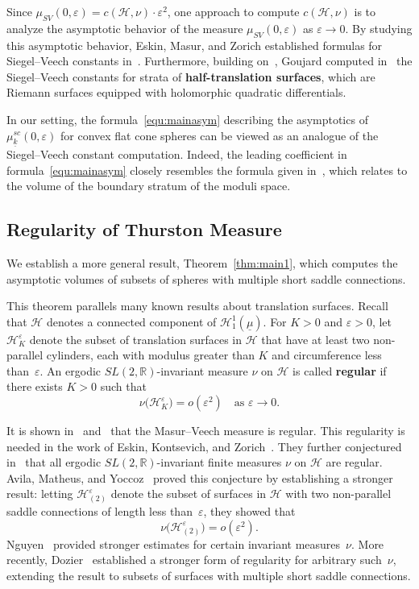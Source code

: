 \documentclass{compositio}
\numberwithin{equation}{section}
\numberwithin{figure}{section}
\theoremstyle{definition}
\theoremstyle{plain}
\begin{document}
{Since $\mu_{SV}(0,\varepsilon) = c(\mathcal{H},\nu) \cdot \varepsilon^2$, one approach to compute $c(\mathcal{H},\nu)$ is to analyze the asymptotic behavior of the measure $\mu_{SV}(0,\varepsilon)$ as $\varepsilon\to0$.
By studying this asymptotic behavior, Eskin, Masur, and Zorich established formulas for Siegel--Veech constants in~\cite{EMZ}. Furthermore, building on~\cite{EMZ}, Goujard computed in~\cite{Gou} the Siegel--Veech constants for strata of \textbf{half-translation surfaces}, which are Riemann surfaces equipped with holomorphic quadratic differentials.

In our setting, the formula~\eqref{equ:mainasym} describing the asymptotics of $\mu^{sc}_{\underline{k}}(0,\varepsilon)$ for convex flat cone spheres can be viewed as an analogue of the Siegel--Veech constant computation. Indeed, the leading coefficient in formula~\eqref{equ:mainasym} closely resembles the formula given in~\cite{EMZ}, which relates to the volume of the boundary stratum of the moduli space.

\subsection{Regularity of Thurston Measure}

We establish a more general result, Theorem~\ref{thm:main1}, which computes the asymptotic volumes of subsets of spheres with multiple short saddle connections.

This theorem parallels many known results about translation surfaces. Recall that $\mathcal{H}$ denotes a connected component of $\mathcal{H}^1_1(\underline{\mu})$.
For $K > 0$ and $\varepsilon > 0$, let $\mathcal{H}_K^\varepsilon$ denote the subset of translation surfaces in $\mathcal{H}$ that have at least two non-parallel cylinders, each with modulus greater than $K$ and circumference less than~$\varepsilon$. An ergodic $SL(2,\mathbb{R})$-invariant measure $\nu$ on $\mathcal{H}$ is called \textbf{regular} if there exists $K > 0$ such that  
$$
\nu\big(\mathcal{H}_K^\varepsilon\big) = o(\varepsilon^2) \quad \text{as } \varepsilon \to 0.
$$

It is shown in~\cite{EMZ} and~\cite{Masur1991} that the Masur--Veech measure is regular. 
This regularity is needed in the work of
Eskin, Kontsevich, and Zorich~\cite{EKZ}. They further conjectured in~\cite{EKZ} that all ergodic $SL(2,\mathbb{R})$-invariant finite measures $\nu$ on $\mathcal{H}$ are regular. Avila, Matheus, and Yoccoz~\cite{Avila2013} proved this conjecture by establishing a stronger result: letting $\mathcal{H}_{(2)}^\varepsilon$ denote the subset of surfaces in $\mathcal{H}$ with two non-parallel saddle connections of length less than~$\varepsilon$, they showed that
$$
\nu\big(\mathcal{H}_{(2)}^\varepsilon\big) = o(\varepsilon^2).
$$
Nguyen~\cite{Nguyen2012} provided stronger estimates for certain invariant measures~$\nu$. More recently, Dozier~\cite{Dozier2023} established a stronger form of regularity for arbitrary such~$\nu$, extending the result to subsets of surfaces with multiple short saddle connections.

}
\end{document}
